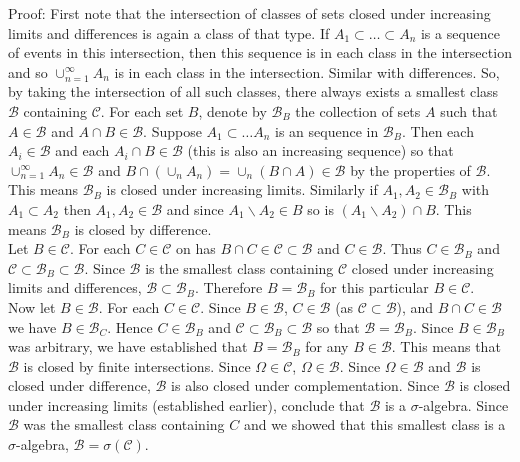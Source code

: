 \documentclass{article}
\begin{document}
{Proof: First note that the intersection of classes of sets closed under increasing limits and differences is again a class of that type. If $A_1 \subset \dots \subset A_n$ is a sequence of events in this intersection, then this sequence is in each class in the intersection and so $\cup_{n=1}^\infty A_n$ is in each class in the intersection. Similar with differences. So, by taking the intersection of all such classes, there always exists a smallest class $\mathcal{B}$ containing $\mathcal{C}$. For each set $B$, denote by $\mathcal{B}_B$ the collection of sets $A$ such that $A \in \mathcal{B}$ and $A\cap B \in \mathcal{B}$. Suppose $A_1 \subset \dots A_n$ is an sequence in $\mathcal{B}_B$. Then each $A_i \in \mathcal{B}$ and each $A_i \cap B \in \mathcal{B}$ (this is also an increasing sequence) so that $\cup_{n=1}^\infty A_n \in \mathcal{B}$ and $B \cap (\cup_n A_n) = \cup_n (B \cap A) \in \mathcal{B}$ by the properties of $\mathcal{B}$. This means $\mathcal{B}_B$ is closed under increasing limits. Similarly if $A_1, A_2 \in \mathcal{B}_B$ with $A_1 \subset A_2$ then $A_1, A_2 \in \mathcal{B}$ and since $A_1 \backslash A_2 \in B$ so is $(A_1 \backslash A_2) \cap B$. This means $\mathcal{B}_B$ is closed by difference. \\

Let $B \in \mathcal{C}$. For each $C \in \mathcal{C}$ on has $B\cap C \in \mathcal{C}\subset \mathcal{B}$ and $C \in \mathcal{B}$. Thus $C \in \mathcal{B}_B$ and $\mathcal{C} \subset \mathcal{B}_B \subset \mathcal{B}$. Since $\mathcal{B}$ is the smallest class containing $\mathcal{C}$ closed under increasing limits and differences, $\mathcal{B} \subset \mathcal{B}_B$. Therefore $B = \mathcal{B}_B$ for this particular $B \in \mathcal{C}$. \\

Now let $B \in \mathcal{B}$. For each $C \in \mathcal{C}$. Since $B \in \mathcal{B}$, $C \in \mathcal{B}$ (as $\mathcal{C} \subset \mathcal{B}$), and $B \cap C \in \mathcal{B}$  we have $B \in \mathcal{B}_C$. Hence $C \in \mathcal{B}_B$ and $\mathcal{C} \subset \mathcal{B}_B \subset \mathcal{B}$ so that $\mathcal{B} = \mathcal{B}_B$. Since $B \in \mathcal{B}_B$ was arbitrary, we have established that $B = \mathcal{B}_B$ for any $B \in \mathcal{B}$. This means that $\mathcal{B}$ is closed by finite intersections. Since $\Omega \in \mathcal{C}$, $\Omega \in \mathcal{B}$. Since $\Omega \in \mathcal{B}$ and $\mathcal{B}$ is closed under difference, $\mathcal{B}$ is also closed under complementation. Since $\mathcal{B}$ is closed under increasing limits (established earlier), conclude that $\mathcal{B}$ is a $\sigma$-algebra. Since $\mathcal{B}$ was the smallest class containing $C$ and we showed that this smallest class is a $\sigma$-algebra, $\mathcal{B} = \sigma(\mathcal{C})$. 

}
\end{document}
